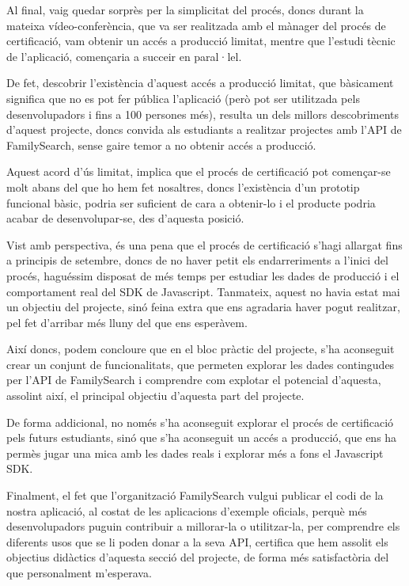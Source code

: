    Al final, vaig quedar sorprès per la simplicitat del procés, doncs durant la mateixa vídeo-conferència, que va ser realitzada amb el mànager del procés de certificació, vam obtenir un accés a producció limitat, mentre que l'estudi tècnic de l'aplicació, començaria a succeir en paral·lel.

    De fet, descobrir l'existència d'aquest accés a producció limitat, que bàsicament significa que no es pot fer pública l'aplicació (però pot ser utilitzada pels desenvolupadors i fins a 100 persones més), resulta un dels millors descobriments d'aquest projecte, doncs convida als estudiants a realitzar projectes amb l'API de FamilySearch, sense gaire temor a no obtenir accés a producció.

    Aquest acord d'ús limitat, implica que el procés de certificació pot començar-se molt abans del que ho hem fet nosaltres, doncs l'existència d'un prototip funcional bàsic, podria ser suficient de cara a obtenir-lo i el producte podria acabar de desenvolupar-se, des d'aquesta posició.

    Vist amb perspectiva, és una pena que el procés de certificació s'hagi allargat fins a principis de setembre, doncs de no haver petit els endarreriments a l'inici del procés, haguéssim disposat de més temps per estudiar les dades de producció i el comportament real del SDK de Javascript. Tanmateix, aquest no havia estat mai un objectiu del projecte, sinó feina extra que ens agradaria haver pogut realitzar, pel fet d'arribar més lluny del que ens esperàvem.

    Així doncs, podem concloure que en el bloc pràctic del projecte, s'ha aconseguit crear un conjunt de funcionalitats, que permeten explorar les dades contingudes per l'API de FamilySearch i comprendre com  explotar el potencial d'aquesta, assolint així, el principal objectiu d'aquesta part del projecte.

    De forma addicional, no només s'ha aconseguit explorar el procés de certificació pels futurs estudiants, sinó que s'ha aconseguit un accés a producció, que ens ha permès jugar una mica amb les dades reals i explorar més a fons el Javascript SDK.

    Finalment, el fet que l'organització FamilySearch vulgui publicar el codi de la nostra aplicació, al costat de les aplicacions d'exemple oficials, perquè més desenvolupadors puguin contribuir a millorar-la o utilitzar-la, per comprendre els diferents usos que se li poden donar a la seva API, certifica que hem assolit els objectius didàctics d'aquesta secció del projecte, de forma més satisfactòria del que personalment m'esperava.
